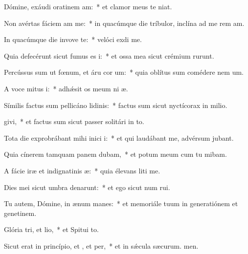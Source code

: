\item Dómine, exáudi oratinem am:~* et clamor meus  te niat.
\item Non avértas fáciem am  me:~* in quacúmque die tríbulor, inclína ad me rem am.
\item In quacúmque die invove te:~* velóci exdi me.
\item Quia defecérunt sicut fumus es i:~* et ossa mea sicut crémium rurunt.
\item Percússus sum ut fœnum, et áru cor um:~* quia oblítus sum comédere nem um.
\item A voce mitus i:~* adhǽsit os meum ni æ.
\item Símilis factus sum pellicáno lidinis:~* factus sum sicut nyctícorax in milio.
\item {}givi,~* et factus sum sicut passer solitári in to.
\item Tota die exprobrábant mihi inici i:~* et qui laudábant me, advérsum  jubant.
\item Quia cínerem tamquam panem dubam,~* et potum meum cum tu mibam.
\item A fácie iræ et indignatinis æ:~* quia élevans liti me.
\item Dies mei sicut umbra denarunt:~* et ego sicut num rui.
\item Tu autem, Dómine, in ænum manes:~* et memoriále tuum in generatiónem et genetinem.
\item Glória tri, et lio,~* et Spitui to.
\item Sicut erat in princípio, et , et per,~* et in sǽcula sæcurum. men.
